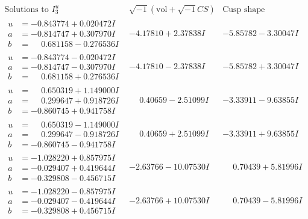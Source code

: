 \documentclass[1p]{elsarticle_modified}
\theoremstyle{definition}
\newcommand{\I}{\sqrt{-1}}
\begin{document}
$$\begin{array}{c|c|c}  
\text{Solutions to }I^u_{3}& \I (\text{vol} + \sqrt{-1}CS) & \text{Cusp shape}\\
 \hline 
\begin{aligned}
u &= -0.843774 + 0.020472 I \\
a &= -0.814747 + 0.307970 I \\
b &= \phantom{-}0.681158 - 0.276536 I\end{aligned}
 & -4.17810 + 2.37838 I & -5.85782 - 3.30047 I \\ \hline\begin{aligned}
u &= -0.843774 - 0.020472 I \\
a &= -0.814747 - 0.307970 I \\
b &= \phantom{-}0.681158 + 0.276536 I\end{aligned}
 & -4.17810 - 2.37838 I & -5.85782 + 3.30047 I \\ \hline\begin{aligned}
u &= \phantom{-}0.650319 + 1.149000 I \\
a &= \phantom{-}0.299647 + 0.918726 I \\
b &= -0.860745 + 0.941758 I\end{aligned}
 & \phantom{-}0.40659 - 2.51099 I & -3.33911 - 9.63855 I \\ \hline\begin{aligned}
u &= \phantom{-}0.650319 - 1.149000 I \\
a &= \phantom{-}0.299647 - 0.918726 I \\
b &= -0.860745 - 0.941758 I\end{aligned}
 & \phantom{-}0.40659 + 2.51099 I & -3.33911 + 9.63855 I \\ \hline\begin{aligned}
u &= -1.028220 + 0.857975 I \\
a &= -0.029407 + 0.419644 I \\
b &= -0.329808 - 0.456715 I\end{aligned}
 & -2.63766 - 10.07530 I & \phantom{-}0.70439 + 5.81996 I \\ \hline\begin{aligned}
u &= -1.028220 - 0.857975 I \\
a &= -0.029407 - 0.419644 I \\
b &= -0.329808 + 0.456715 I\end{aligned}
 & -2.63766 + 10.07530 I & \phantom{-}0.70439 - 5.81996 I \\ \hline\begin{aligned}

\end{aligned}
\end{array}$$
\end{document}
